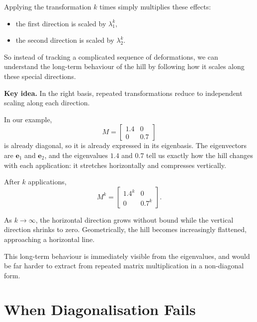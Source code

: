 \documentclass[11pt,openany]{book}
\theoremstyle{definition}
\begin{document}
\medskip

Applying the transformation $k$ times simply multiplies these effects:

\begin{itemize}
  \item the first direction is scaled by $\lambda_1^k$,
  \item the second direction is scaled by $\lambda_2^k$.
\end{itemize}

\medskip

So instead of tracking a complicated sequence of deformations, we can understand 
the long-term behaviour of the hill by following how it scales along these special directions.

\medskip

\textbf{Key idea.} In the right basis, repeated transformations reduce to independent scaling along each direction.

\medskip

In our example,
\[
M = \begin{bmatrix} 1.4 & 0 \\ 0 & 0.7 \end{bmatrix}
\]
is already diagonal, so it is already expressed in its eigenbasis. The eigenvectors 
are $\mathbf{e}_1$ and $\mathbf{e}_2$, and the eigenvalues $1.4$ and $0.7$ tell us 
exactly how the hill changes with each application: it stretches horizontally and 
compresses vertically.

\medskip

After $k$ applications,
\[
M^k = \begin{bmatrix} 1.4^k & 0 \\ 0 & 0.7^k \end{bmatrix}.
\]

\medskip

As $k \to \infty$, the horizontal direction grows without bound while the vertical 
direction shrinks to zero. Geometrically, the hill becomes increasingly flattened, 
approaching a horizontal line.

\medskip

This long-term behaviour is immediately visible from the eigenvalues, and would be 
far harder to extract from repeated matrix multiplication in a non-diagonal form.

\section{When Diagonalisation Fails}
\end{document}
